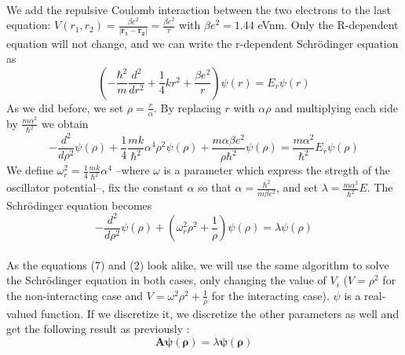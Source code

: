 \documentclass[a4paper, twoside, 11pt]{report}
\theoremstyle{theorem}
\theoremstyle{remark}
\theoremstyle{exemple}
\begin{document}
    \paragraph{}We add  the repulsive Coulomb interaction between the two electrons to the last equation: $V(r_1,r_2)=\frac{\beta e^2}{|\mathbf{r_1}-\mathbf{r_2}|} = \frac{\beta e^2}{r}$ with $\beta e^2= 1.44$ eVnm. Only the R-dependent equation will not change, and we can write the r-dependent Schrödinger equation as 
        \begin{equation}
            \left(-\frac{\hbar^2}{m}\frac{d^2}{dr^2}+\frac{1}{4}kr^2+\frac{\beta e^2}{r}\right)\psi(r)=E_r\psi(r)
            \tag{6}
        \end{equation}
    As we did before, we set $\rho=\frac{r}{\alpha}$. By replacing $r$ with $\alpha \rho$ and multiplying each side by $\frac{m\alpha^2}{\hbar^2}$ we obtain 
        \begin{equation*}
            -\frac{d^2}{d\rho^2}\psi(\rho) + \frac{1}{4}\frac{mk}{\hbar^2}\alpha^4\rho^2\psi(\rho) + \frac{m\alpha \beta e^2}{\rho \hbar^2}\psi(\rho) = \frac{m\alpha^2}{\hbar^2} E_r \psi(\rho)
        \end{equation*}
    We define $\omega_r^2 = \frac{1}{4}\frac{mk}{\hbar^2}\alpha^4$ --where $\omega$ is a parameter which express the stregth of the oscillator potential--, fix the constant $\alpha$ so that $\alpha = \frac{\hbar^2}{m\beta e^2}$, and set $\lambda = \frac{m\alpha^2}{\hbar^2}E$. The Schrödinger equation becomes 
        \begin{equation}
            -\frac{d^2}{d\rho^2}\psi(\rho)+\left(\omega_r^2\rho^2+\frac{1}{\rho}\right)\psi(\rho)=\lambda\psi(\rho)
            \tag{7}
        \end{equation}
    \paragraph{}As the equations (7) and (2) look alike, we will use the same algorithm to solve the Schrödinger equation in both cases, only changing the value of $V_i$ ($V=\rho^2$ for the non-interacting case and $V=\omega^2\rho^2+\frac{1}{\rho}$ for the interacting case). $\psi$ is a real-valued function. If we discretize it, we discretize the other parameters as well and get the following result as previously :
        \begin{equation}
            \mathbf{A\psi(\rho)}=\lambda\mathbf{\psi(\rho)}
        \tag{8}
        \end{equation}
    
\end{document}
